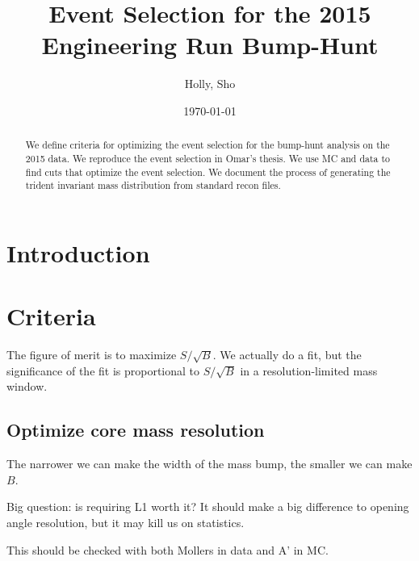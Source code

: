 \documentclass[twoside]{article}
\title{Event Selection for the 2015 Engineering Run Bump-Hunt} %
\author{Holly, Sho}
\date{\today}
\begin{document}
\maketitle %

\thispagestyle{fancy} %


\begin{abstract}
    We define criteria for optimizing the event selection for the bump-hunt analysis on the 2015 data.
    We reproduce the event selection in Omar's thesis.
    We use MC and data to find cuts that optimize the event selection.
    We document the process of generating the trident invariant mass distribution from standard recon files.
\end{abstract}



\section{Introduction}

\section{Criteria}
The figure of merit is to maximize $S/\sqrt{B}$. We actually do a fit, but the significance of the fit is proportional to $S/\sqrt{B}$ in a resolution-limited mass window.

\subsection{Optimize core mass resolution}
The narrower we can make the width of the mass bump, the smaller we can make $B$.

Big question: is requiring L1 worth it? It should make a big difference to opening angle resolution, but it may kill us on statistics.

This should be checked with both Mollers in data and A' in MC.
\end{document}
